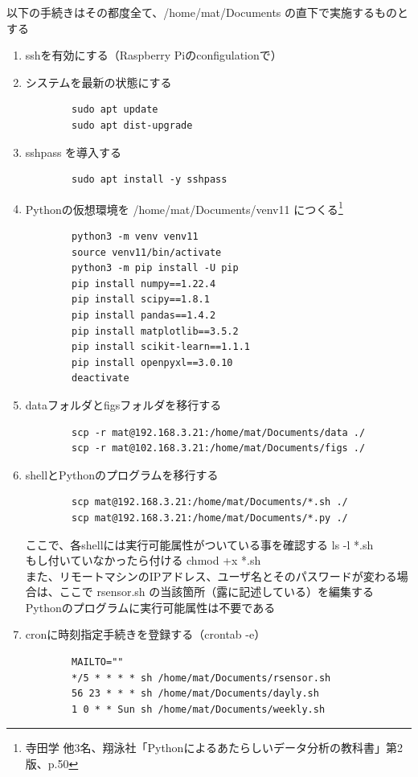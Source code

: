 \documentclass[12pt,a4paper,uplatex]{jsarticle}
\begin{document}
以下の手続きはその都度全て、/home/mat/Documents の直下で実施するものとする

\begin{enumerate}
	\item sshを有効にする（Raspberry Piのconfigulationで）
	\item システムを最新の状態にする
	\begin{verbatim}
		sudo apt update
		sudo apt dist-upgrade
	\end{verbatim}
	\item sshpass を導入する
	\begin{verbatim}
		sudo apt install -y sshpass 
	\end{verbatim}
	\item Pythonの仮想環境を /home/mat/Documents/venv11 につくる\footnote{寺田学 他3名、翔泳社「Pythonによるあたらしいデータ分析の教科書」第2版、p.50}
	\begin{verbatim}
		python3 -m venv venv11
		source venv11/bin/activate
		python3 -m pip install -U pip
		pip install numpy==1.22.4
		pip install scipy==1.8.1
		pip install pandas==1.4.2
		pip install matplotlib==3.5.2
		pip install scikit-learn==1.1.1
		pip install openpyxl==3.0.10
		deactivate
	\end{verbatim}
	\item dataフォルダとfigsフォルダを移行する
	\begin{verbatim}
		scp -r mat@192.168.3.21:/home/mat/Documents/data ./
		scp -r mat@102.168.3.21:/home/mat/Documents/figs ./
	\end{verbatim}
	\item shellとPythonのプログラムを移行する
	\begin{verbatim}
		scp mat@192.168.3.21:/home/mat/Documents/*.sh ./
		scp mat@192.168.3.21:/home/mat/Documents/*.py ./
	\end{verbatim}
	ここで、各shellには実行可能属性がついている事を確認する ls -l *.sh\\
	もし付いていなかったら付ける chmod +x *.sh\\
	また、リモートマシンのIPアドレス、ユーザ名とそのパスワードが変わる場合は、ここで rsensor.sh の当該箇所（露に記述している）を編集する\\
	Pythonのプログラムに実行可能属性は不要である
	\item cronに時刻指定手続きを登録する（crontab -e）
	\begin{verbatim}
		MAILTO=""
		*/5 * * * * sh /home/mat/Documents/rsensor.sh
		56 23 * * * sh /home/mat/Documents/dayly.sh
		1 0 * * Sun sh /home/mat/Documents/weekly.sh

\end{verbatim}
\end{enumerate}
\end{document}
